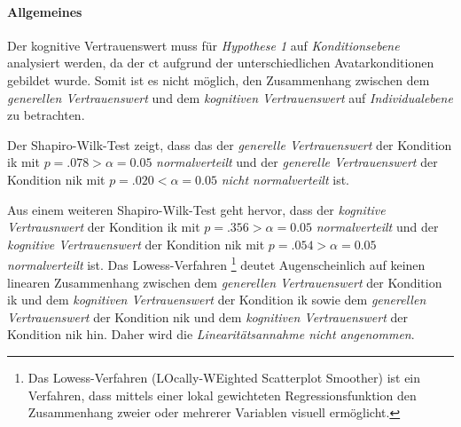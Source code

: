 \documentclass[a4paper,11pt]{article}%
\renewcommand{\\}{\vspace*{0.5\baselineskip} \newline}
\begin{document}
\paragraph{Allgemeines}
Der kognitive Vertrauenswert muss für \textit{Hypothese 1} auf \textit{Konditionsebene} analysiert werden, da der \ac{ct} aufgrund der unterschiedlichen Avatarkonditionen gebildet wurde. Somit ist es nicht möglich, den Zusammenhang zwischen dem \textit{generellen Vertrauenswert} und dem \textit{kognitiven Vertrauenswert} auf \textit{Individualebene} zu betrachten.

Der Shapiro-Wilk-Test zeigt, dass das der \textit{generelle Vertrauenswert} der Kondition \ac{ik} mit  $p = .078 > \alpha = 0.05$ \textit{normalverteilt} und der \textit{generelle Vertrauenswert} der Kondition \ac{nik} mit $p = .020 < \alpha = 0.05$ \textit{nicht normalverteilt} ist.

Aus einem weiteren Shapiro-Wilk-Test geht hervor, dass der \textit{kognitive Vertrausnwert} der Kondition \ac{ik} mit  $p = .356 > \alpha = 0.05$ \textit{normalverteilt} und der \textit{kognitive Vertrauenswert} der Kondition \ac{nik} mit $p = .054 > \alpha = 0.05$ \textit{normalverteilt} ist.
Das Lowess-Verfahren \footnote{Das Lowess-Verfahren (LOcally-WEighted Scatterplot Smoother) ist ein Verfahren, dass mittels einer lokal gewichteten Regressionsfunktion den Zusammenhang zweier oder mehrerer Variablen visuell ermöglicht.} deutet Augenscheinlich auf keinen linearen Zusammenhang zwischen dem \textit{generellen Vertrauenswert} der Kondition \ac{ik} und dem \textit{kognitiven Vertrauenswert} der Kondition \ac{ik} sowie dem \textit{generellen Vertrauenswert} der Kondition \ac{nik} und dem \textit{kognitiven Vertrauenswert} der Kondition \ac{nik} hin. Daher wird die \textit{Linearitätsannahme nicht angenommen}.

\end{document}

